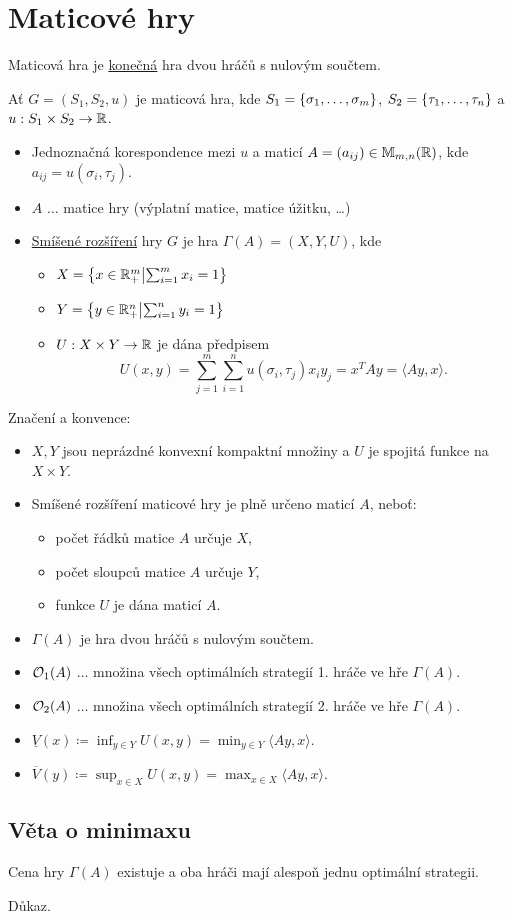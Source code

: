 \section{Maticové hry}
Maticová hra je \hyperref[konecna]{konečná} hra dvou hráčů s nulovým součtem.

Ať $G = (S_1, S_2, u)$ je maticová hra, kde $S_1 = \left\lbrace \sigma_1, \dots, \sigma_m \right\rbrace$, $S_2 = \left\lbrace \tau_1, \dots, \tau_n \right\rbrace$
a $u : S_1 \times S_2 \rightarrow \mathbb{R}$.

\begin{itemize}
    \item Jednoznačná korespondence mezi $u$ a maticí $A = (a_{ij}) \in \mathbb{M}_{m,n}(\mathbb{R})$, kde 
    $a_{ij} = u(\sigma_i, \tau_j)$.
    \item $A$ $\dots$ matice hry (výplatní matice, matice úžitku, \dots)
    \item \hyperref[smisRoz]{Smíšené rozšíření} hry $G$ je hra $\Gamma(A) = (X, Y, U)$, kde
    \begin{itemize}
        \item $X = \left\lbrace x \in \mathbb{R}_+^m \middle| \sum_{i=1}^{m} x_i=1 \right\rbrace$
        \item $Y = \left\lbrace y \in \mathbb{R}_+^n \middle| \sum_{i=1}^{n} y_i=1 \right\rbrace$
        \item $U : X \times Y \rightarrow \mathbb{R}$ je dána předpisem
        \[
            U(x,y) = \sum_{j=1}^{m}\sum_{i=1}^{n}u(\sigma_i, \tau_j)x_iy_j = x^T Ay = \langle Ay, x\rangle.
        \]
    \end{itemize}
\end{itemize}
Značení a konvence:
\begin{itemize}
    \item $X, Y$ jsou neprázdné konvexní kompaktní množiny a $U$ je spojitá funkce na $X \times Y$.
    \item Smíšené rozšíření maticové hry je plně určeno maticí $A$, neboť:
    \begin{itemize}
        \item počet řádků matice $A$ určuje $X$,
        \item počet sloupců matice $A$ určuje $Y$,
        \item funkce $U$ je dána maticí $A$.
    \end{itemize}
    \item $\Gamma(A)$ je hra dvou hráčů s nulovým součtem.
    \item $\mathcal{O}_1 (A)$ $\dots$ množina všech optimálních strategií 1. hráče ve hře $\Gamma(A)$.
    \item $\mathcal{O}_2 (A)$ $\dots$ množina všech optimálních strategií 2. hráče ve hře $\Gamma(A)$.
    \item $\underline{V}(x) \coloneq \inf_{y\in Y}U(x,y) = \min_{y\in Y} \langle Ay, x\rangle$.
    \item $\overline{V}(y)  \coloneq \sup_{x\in X}U(x,y) = \max_{x\in X} \langle Ay, x\rangle$.
\end{itemize}

\subsection{Věta o minimaxu}
Cena hry $\Gamma(A)$ existuje a oba hráči mají alespoň jednu optimální strategii.

Důkaz.
